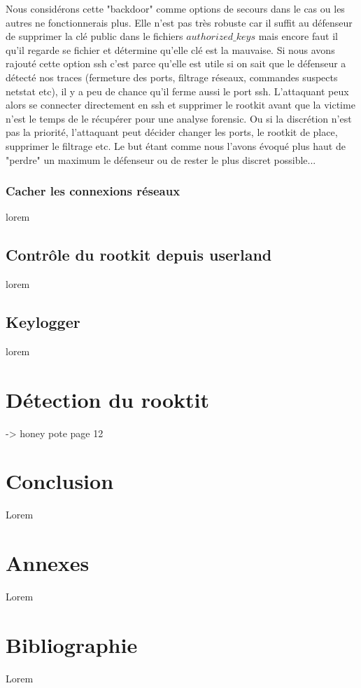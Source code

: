 \documentclass[11pt]{article}
\begin{document}
			Nous considérons cette "backdoor" comme options de secours dans le cas ou les autres ne fonctionnerais plus. Elle n'est pas très robuste car il suffit au défenseur de supprimer la clé public  dans le fichiers $authorized\_keys$ mais encore faut il qu'il regarde se fichier et détermine qu'elle clé est la mauvaise. 
			Si nous avons rajouté cette option ssh c'est parce qu'elle est utile si on sait que le défenseur a détecté nos traces (fermeture des ports, filtrage réseaux, commandes  suspects netstat etc), il y a peu de chance qu'il ferme aussi le port ssh. L'attaquant peux alors se connecter directement en ssh et supprimer le rootkit avant que la victime n'est le temps de le récupérer pour une analyse forensic. Ou si la discrétion n'est pas la priorité, l'attaquant peut décider changer les ports, le rootkit de place, supprimer le filtrage  etc. Le but étant comme nous l'avons évoqué plus haut de "perdre" un maximum le défenseur ou de rester le plus discret possible... 
			
		\subsubsection{Cacher les connexions réseaux}
			lorem
			
	\subsection{Contrôle du rootkit depuis userland}
		lorem
	\subsection{Keylogger}
		lorem
		
\section{Détection du rooktit}
	
	-> honey pote page 12
	
			
\section{Conclusion}
	Lorem
\section{Annexes}
	Lorem
\section{Bibliographie}
	Lorem
\end{document}
